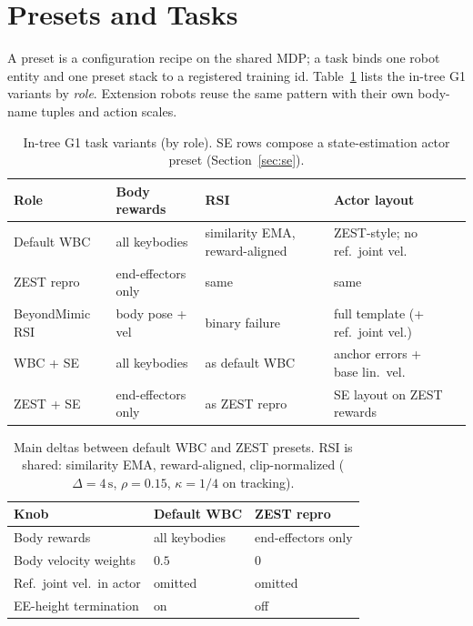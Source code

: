 \documentclass[11pt,a4paper]{article}
\begin{document}
\section{Presets and Tasks}
\label{sec:tasks}

A preset is a configuration recipe on the shared MDP; a task binds one robot
entity and one preset stack to a registered training id. Table~\ref{tab:presets}
lists the in-tree G1 variants by \emph{role}. Extension robots reuse the same
pattern with their own body-name tuples and action scales.

\begin{table}[t]
  \centering
  \scriptsize
  \setlength{\tabcolsep}{3pt}
  \caption{In-tree G1 task variants (by role). SE rows compose a
  state-estimation actor preset (Section~\ref{sec:se}).}
  \label{tab:presets}
  \begin{tabular}{@{}llllp{2.4cm}@{}}
    \toprule
    Role & Body rewards & RSI & Actor layout \\
    \midrule
    Default WBC & all keybodies & similarity EMA,
      reward-aligned & ZEST-style; no ref.\ joint vel. \\
    ZEST repro & end-effectors only & same & same \\
    BeyondMimic RSI & body pose + vel & binary failure
      & full template (+ ref.\ joint vel.) \\
    WBC + SE & all keybodies & as default WBC
      & anchor errors + base lin.\ vel. \\
    ZEST + SE & end-effectors only & as ZEST repro
      & SE layout on ZEST rewards \\
    \bottomrule
  \end{tabular}
\end{table}

\begin{table}[t]
  \centering
  \small
  \caption{Main deltas between default WBC and ZEST presets. RSI is shared:
  similarity EMA, reward-aligned, clip-normalized
  ($\Delta{=}4\,\mathrm{s}$, $\rho{=}0.15$, $\kappa{=}1/4$ on tracking).}
  \label{tab:preset-delta}
  \begin{tabular}{@{}lll@{}}
    \toprule
    Knob & Default WBC & ZEST repro \\
    \midrule
    Body rewards & all keybodies & end-effectors only \\
    Body velocity weights & $0.5$ & $0$ \\
    Ref.\ joint vel.\ in actor & omitted & omitted \\
    EE-height termination & on & off \\
    \bottomrule
  \end{tabular}
\end{table}
\end{document}
